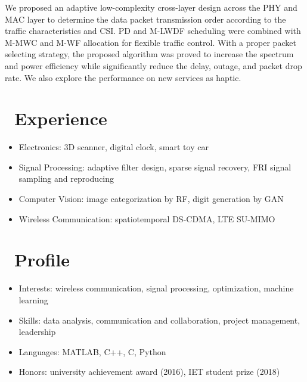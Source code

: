 \documentclass{resume}
\begin{document}
We proposed an adaptive low-complexity cross-layer design across the PHY and MAC layer to determine the data packet transmission order according to the traffic characteristics and CSI. PD and M-LWDF scheduling were combined with M-MWC and M-WF allocation for flexible traffic control. With a proper packet selecting strategy, the proposed algorithm was proved to increase the spectrum and power efficiency while significantly reduce the delay, outage, and packet drop rate. We also explore the performance on new services as haptic.

\section{\faTasks\ Experience}

\begin{itemize}[noitemsep,nolistsep]
  \item Electronics: 3D scanner, digital clock, smart toy car
  \item Signal Processing: adaptive filter design, sparse signal recovery, FRI signal sampling and reproducing
  \item Computer Vision: image categorization by RF, digit generation by GAN
  \item Wireless Communication: spatiotemporal DS-CDMA, LTE SU-MIMO
\end{itemize}

\section{\faHeartO\ Profile}

\begin{itemize}[noitemsep,nolistsep]
  \item Interests: wireless communication, signal processing, optimization, machine learning
  \item Skills: data analysis, communication and collaboration, project management, leadership
  \item Languages: MATLAB, C++, C, Python
  \item Honors: university achievement award (2016), IET student prize (2018)
\end{itemize}
\end{document}
